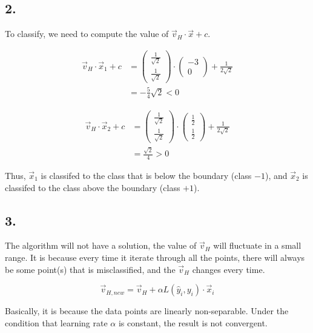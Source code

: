 \documentclass[]{article}
\begin{document}
\subsection{2.}\label{section-4}

To classify, we need to compute the value of
\({\vec{v}}_H\cdot\vec{x} + c\).

\[\begin{aligned}
{\vec{v}}_H\cdot{\vec{x}}_1 + c &= 
\begin{pmatrix}\frac{1}{\sqrt{2}}\\\frac{1}{\sqrt{2}}\end{pmatrix}\cdot
\begin{pmatrix}-3\\0\end{pmatrix} + \frac{1}{2\sqrt{2}}\\
&=-\frac{5}{4}\sqrt{2}<0
\end{aligned}\]

\[\begin{aligned}
{\vec{v}}_H\cdot{\vec{x}}_2 + c &= 
\begin{pmatrix}\frac{1}{\sqrt{2}}\\\frac{1}{\sqrt{2}}\end{pmatrix}\cdot
\begin{pmatrix}\frac{1}{2}\\\frac{1}{2}\end{pmatrix} + \frac{1}{2\sqrt{2}}\\
&=\frac{\sqrt{2}}{4}>0
\end{aligned}\]

Thus, \({\vec{x}}_1\) is classifed to the class that is below the
boundary (class \(-1\)), and \({\vec{x}}_2\) is classifed to the class
above the boundary (class \(+1\)).

\subsection{3.}\label{section-5}

The algorithm will not have a solution, the value of \({\vec{v}}_H\)
will fluctuate in a small range. It is because every time it iterate
through all the points, there will always be some point(s) that is
misclassified, and the \(\vec{v}_H\) changes every time.

\[\vec{v}_{H,new} = \vec{v}_H + \alpha L(\hat{y}_i,y_i) \cdot \vec{x}_i\]

Basically, it is because the data points are linearly non-separable.
Under the condition that learning rate \(\alpha\) is constant, the
result is not convergent.
\end{document}
